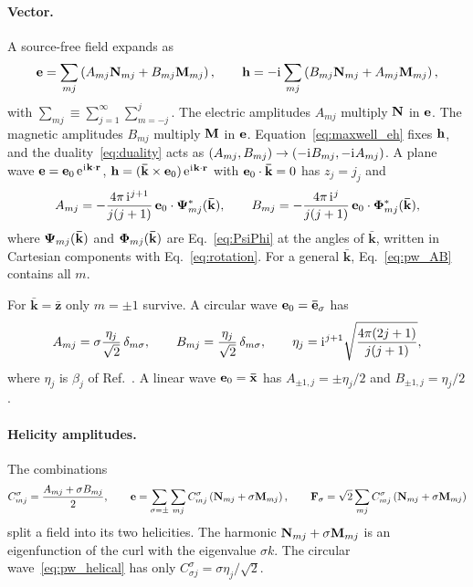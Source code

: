 \documentclass[
    pra,
    aps,
    reprint,
    onecolumn,
    amsmath,amssymb,
    a4paper,
    superscriptaddress,
    10pt,
    nofootinbib
]{revtex4-2}
\newcommand{\iu}{\mathrm{i}\mkern1mu}                 %
\newcommand{\eu}{\mathrm{e}\mkern1mu}                 %
\newcommand{\ort}[1]{\boldsymbol{\mathbf{\bar{#1}}}}  %
\newcommand{\jj}{j(j+1)}
\begin{document}
\paragraph{Vector.}
A source-free field expands as~\cite{Thesis}
\begin{equation}
    \vb{e} = \sum_{mj}\left( A_{mj}\vb{N}_{mj} + B_{mj}\vb{M}_{mj}\right), \qquad
    \vb{h} = -\iu\sum_{mj}\left( B_{mj}\vb{N}_{mj} + A_{mj}\vb{M}_{mj}\right),
    \label{eq:vsh_expansion}
\end{equation}
with $\sum_{mj} \equiv \sum_{j=1}^\infty\sum_{m=-j}^j$.
The electric amplitudes $A_{mj}$ multiply $\vb{N}$ in $\vb{e}$.
The magnetic amplitudes $B_{mj}$ multiply $\vb{M}$ in $\vb{e}$.
Equation~\eqref{eq:maxwell_eh} fixes $\vb{h}$, and the duality~\eqref{eq:duality} acts as $(A_{mj}, B_{mj}) \to (-\iu B_{mj}, -\iu A_{mj})$.
A plane wave $\vb{e} = \vb{e}_0\, \eu^{\iu\vb{k}\cdot\vb{r}}$, $\vb{h} = (\ort{k}\times\vb{e}_0)\, \eu^{\iu\vb{k}\cdot\vb{r}}$ with $\vb{e}_0\cdot\ort{k} = 0$ has $z_j = j_j$ and
\begin{equation}
    A_{mj} = -\frac{4\pi\, \iu^{j+1}}{\jj}\, \vb{e}_0\cdot\vb{\Psi}^*_{mj}(\ort{k}), \qquad
    B_{mj} = -\frac{4\pi\, \iu^{j}}{\jj}\, \vb{e}_0\cdot\vb{\Phi}^*_{mj}(\ort{k}),
    \label{eq:pw_AB}
\end{equation}
where $\vb{\Psi}_{mj}(\ort{k})$ and $\vb{\Phi}_{mj}(\ort{k})$ are Eq.~\eqref{eq:PsiPhi} at the angles of $\ort{k}$, written in Cartesian components with Eq.~\eqref{eq:rotation}.
For a general $\ort{k}$, Eq.~\eqref{eq:pw_AB} contains all $m$.

For $\ort{k} = \ort{z}$ only $m = \pm1$ survive.
A circular wave $\vb{e}_0 = \ort{e}_\sigma$ has
\begin{equation}
    A_{mj} = \sigma \frac{\eta_j}{\sqrt{2}}\, \delta_{m\sigma}, \qquad
    B_{mj} = \frac{\eta_j}{\sqrt{2}}\, \delta_{m\sigma}, \qquad
    \eta_j = \iu^{j+1}\sqrt{\frac{4\pi(2j+1)}{\jj}},
    \label{eq:pw_helical}
\end{equation}
where $\eta_j$ is $\beta_j$ of Ref.~\cite{Thesis}.
A linear wave $\vb{e}_0 = \ort{x}$ has $A_{\pm1, j} = \pm\eta_j/2$ and $B_{\pm1, j} = \eta_j/2$.

\paragraph{Helicity amplitudes.}
The combinations
\begin{equation}
    C^{\sigma}_{mj} = \frac{A_{mj} + \sigma B_{mj}}{2}, \qquad
    \vb{e} = \sum_{\sigma = \pm}\sum_{mj} C^\sigma_{mj}\left(\vb{N}_{mj} + \sigma\vb{M}_{mj}\right), \qquad
    \vb{F}_\sigma = \sqrt{2}\sum_{mj} C^\sigma_{mj}\left(\vb{N}_{mj} + \sigma\vb{M}_{mj}\right)
    \label{eq:helicity_amplitudes}
\end{equation}
split a field into its two helicities.
The harmonic $\vb{N}_{mj} + \sigma\vb{M}_{mj}$ is an eigenfunction of the curl with the eigenvalue $\sigma k$.
The circular wave~\eqref{eq:pw_helical} has only $C^{\sigma}_{\sigma j} = \sigma\eta_j/\sqrt{2}$.
\end{document}
